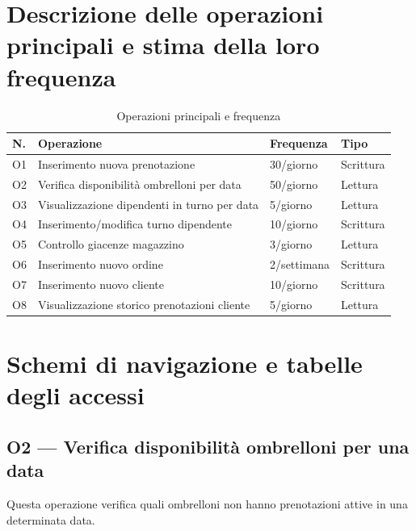\section{Descrizione delle operazioni principali e stima della loro frequenza}

\begin{table}[H]
  \centering
  \caption{Operazioni principali e frequenza}
  \label{tab:operazioni}
  \begin{tabularx}{\textwidth}{C{0.6cm} L{6cm} C{2.5cm} C{2.5cm}}
    \toprule
    \textbf{N.} & \textbf{Operazione} & \textbf{Frequenza} & \textbf{Tipo} \\
    \midrule
    O1 & Inserimento nuova prenotazione            & 30/giorno   & Scrittura \\
    O2 & Verifica disponibilit\`{a} ombrelloni per data& 50/giorno   & Lettura \\
    O3 & Visualizzazione dipendenti in turno per data & 5/giorno & Lettura \\
    O4 & Inserimento/modifica turno dipendente     & 10/giorno   & Scrittura \\
    O5 & Controllo giacenze magazzino              & 3/giorno    & Lettura \\
    O6 & Inserimento nuovo ordine                  & 2/settimana & Scrittura \\
    O7 & Inserimento nuovo cliente                 & 10/giorno   & Scrittura \\
    O8 & Visualizzazione storico prenotazioni cliente & 5/giorno & Lettura \\
    \bottomrule
  \end{tabularx}
\end{table}

\section{Schemi di navigazione e tabelle degli accessi}

\subsection{O2 --- Verifica disponibilit\`{a} ombrelloni per una data}

Questa operazione verifica quali ombrelloni non hanno prenotazioni attive
in una determinata data.


